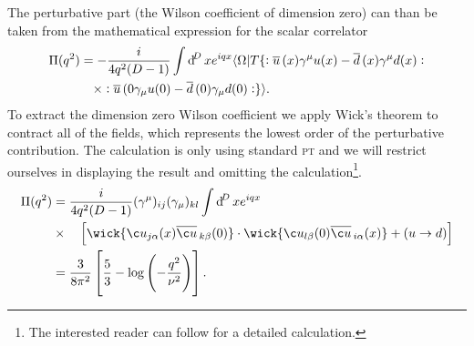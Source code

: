 \documentclass[../../index.tex]{subfiles}
\begin{document}
The perturbative part (the Wilson coefficient of dimension zero) can than be
taken from the mathematical expression for the scalar correlator
\begin{equation}
  \label{eq:rhoScalarCorrelator}
  \begin{split}
    \Pi(q^2) &= - \frac{i}{4 q^2 (D -1)} \int \dif^D x e^{iqx} \langle \Omega \vert T \{:\anti{u}(x) \gamma^\mu u(x) - \anti{d}(x) \gamma^\mu d(x): \\
    &\quad\times :\anti{u}(0 \gamma_\mu u(0) - \anti{d}(0)\gamma_\mu d(0): \}
    \rangle.
  \end{split}
\end{equation}
To extract the dimension zero Wilson coefficient we apply Wick's theorem to
contract all of the fields, which represents the lowest order of the
perturbative contribution. The calculation is only using standard \textsc{pt}
and we will restrict ourselves in displaying the result and omitting the
calculation\footnote{The interested reader can follow \cite{Pascual1984} for a
  detailed calculation.}.
\begin{equation}
  \begin{split}
    \Pi(q^2) &= \frac{i}{4q^2(D-1)} (\gamma^\mu)_{ij} (\gamma_\mu)_{kl} \int \dif^D x e^{iqx} \\
    &\times\quad\left[ \wick{ \c u_{j \alpha}(x) \anti{\c u}_{k \beta}(0)} \cdot
      \wick{\c u_{l \beta}(0) \anti{\c u}_{i \alpha}(x)} + (u \to d)
    \right] \\
    &= \frac{3}{8\pi^2} \left[ \frac{5}{3} - \log\left( -\frac{q^2}{\nu^2}
      \right) \right].
  \end{split}
\end{equation}
\end{document}
